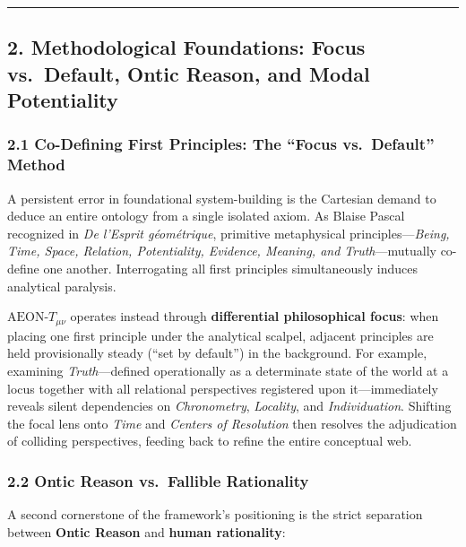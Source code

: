 \documentclass[
]{article}
\begin{document}
\begin{center}\rule{0.5\linewidth}{0.5pt}\end{center}

\subsection{2. Methodological Foundations: Focus vs.~Default, Ontic
Reason, and Modal
Potentiality}\label{methodological-foundations-focus-vs.-default-ontic-reason-and-modal-potentiality}

\subsubsection{2.1 Co-Defining First Principles: The ``Focus
vs.~Default''
Method}\label{co-defining-first-principles-the-focus-vs.-default-method}

A persistent error in foundational system-building is the Cartesian
demand to deduce an entire ontology from a single isolated axiom. As
Blaise Pascal recognized in \emph{De l'Esprit géométrique}, primitive
metaphysical principles---\emph{Being, Time, Space, Relation,
Potentiality, Evidence, Meaning, and Truth}---mutually co-define one
another. Interrogating all first principles simultaneously induces
analytical paralysis.

\(\text{AEON-}T_{\mu\nu}\) operates instead through \textbf{differential
philosophical focus}: when placing one first principle under the
analytical scalpel, adjacent principles are held provisionally steady
(``set by default'') in the background. For example, examining
\emph{Truth}---defined operationally as a determinate state of the world
at a locus together with all relational perspectives registered upon
it---immediately reveals silent dependencies on \emph{Chronometry},
\emph{Locality}, and \emph{Individuation}. Shifting the focal lens onto
\emph{Time} and \emph{Centers of Resolution} then resolves the
adjudication of colliding perspectives, feeding back to refine the
entire conceptual web.

\subsubsection{2.2 Ontic Reason vs.~Fallible
Rationality}\label{ontic-reason-vs.-fallible-rationality}

A second cornerstone of the framework's positioning is the strict
separation between \textbf{Ontic Reason} and \textbf{human rationality}:
\end{document}
